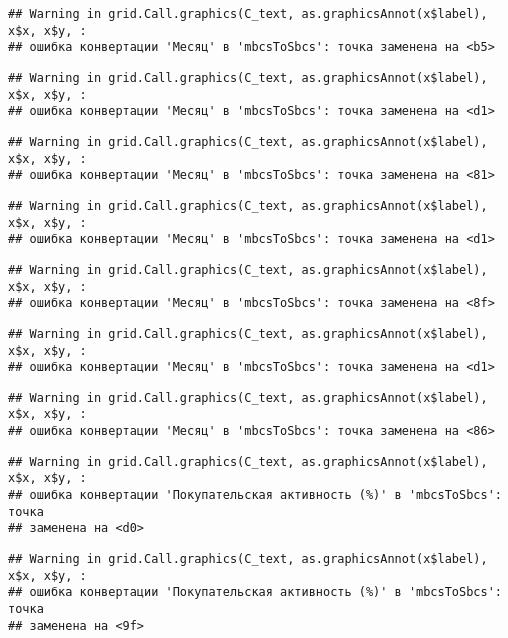 \documentclass[
]{article}
\begin{document}
\begin{verbatim}
## Warning in grid.Call.graphics(C_text, as.graphicsAnnot(x$label), x$x, x$y, :
## ошибка конвертации 'Месяц' в 'mbcsToSbcs': точка заменена на <b5>
\end{verbatim}

\begin{verbatim}
## Warning in grid.Call.graphics(C_text, as.graphicsAnnot(x$label), x$x, x$y, :
## ошибка конвертации 'Месяц' в 'mbcsToSbcs': точка заменена на <d1>
\end{verbatim}

\begin{verbatim}
## Warning in grid.Call.graphics(C_text, as.graphicsAnnot(x$label), x$x, x$y, :
## ошибка конвертации 'Месяц' в 'mbcsToSbcs': точка заменена на <81>
\end{verbatim}

\begin{verbatim}
## Warning in grid.Call.graphics(C_text, as.graphicsAnnot(x$label), x$x, x$y, :
## ошибка конвертации 'Месяц' в 'mbcsToSbcs': точка заменена на <d1>
\end{verbatim}

\begin{verbatim}
## Warning in grid.Call.graphics(C_text, as.graphicsAnnot(x$label), x$x, x$y, :
## ошибка конвертации 'Месяц' в 'mbcsToSbcs': точка заменена на <8f>
\end{verbatim}

\begin{verbatim}
## Warning in grid.Call.graphics(C_text, as.graphicsAnnot(x$label), x$x, x$y, :
## ошибка конвертации 'Месяц' в 'mbcsToSbcs': точка заменена на <d1>
\end{verbatim}

\begin{verbatim}
## Warning in grid.Call.graphics(C_text, as.graphicsAnnot(x$label), x$x, x$y, :
## ошибка конвертации 'Месяц' в 'mbcsToSbcs': точка заменена на <86>
\end{verbatim}

\begin{verbatim}
## Warning in grid.Call.graphics(C_text, as.graphicsAnnot(x$label), x$x, x$y, :
## ошибка конвертации 'Покупательская активность (%)' в 'mbcsToSbcs': точка
## заменена на <d0>
\end{verbatim}

\begin{verbatim}
## Warning in grid.Call.graphics(C_text, as.graphicsAnnot(x$label), x$x, x$y, :
## ошибка конвертации 'Покупательская активность (%)' в 'mbcsToSbcs': точка
## заменена на <9f>
\end{verbatim}
\end{document}
